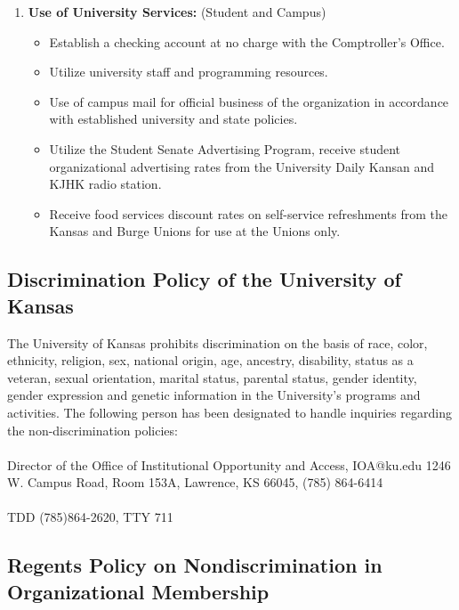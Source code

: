\begin{enumerate}
	\item \textbf{Use of University Services:} (Student and Campus)
	\begin{itemize}
		\item Establish a checking account at no charge with the Comptroller's Office.
		\item Utilize university staff and programming resources.
		\item Use of campus mail for official business of the organization in accordance with established university and state policies.
		\item Utilize the Student Senate Advertising Program, receive student organizational advertising rates from the University Daily Kansan and KJHK radio station.
		\item Receive food services discount rates on self-service refreshments from the Kansas and Burge Unions for use at the Unions only.
	\end{itemize}
\end{enumerate}


\subsection{Discrimination Policy of the University of Kansas}

The University of Kansas prohibits discrimination on the basis of race, color, ethnicity, religion, sex, national origin, age, ancestry, disability, status as a veteran, sexual orientation, marital status, parental status, gender identity, gender expression and genetic information in the University’s programs and activities. The following person has been designated to handle inquiries regarding the non-discrimination policies:
\\
\\
Director of the Office of Institutional Opportunity and Access, IOA@ku.edu
1246 W. Campus Road, Room 153A, Lawrence, KS 66045, (785) 864-6414
\\
\\
TDD (785)864-2620, TTY 711

\subsection{Regents Policy on Nondiscrimination in Organizational Membership}

